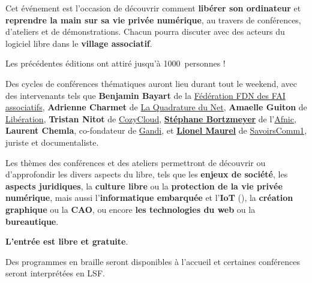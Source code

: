 
\Separateur

Cet événement est l'occasion de découvrir comment \textbf{libérer son ordinateur}
et \textbf{reprendre la main sur sa vie privée numérique},
au travers de conférences, d'ateliers et de démonstrations.
Chacun pourra discuter avec des acteurs du logiciel libre dans le \textbf{village associatif}.

Les précédentes éditions ont attiré jusqu'à \num{1000}~personnes !

\Separateur

Des cycles de conférences thématiques auront lieu durant tout le weekend,
avec des intervenants tels que \textbf{Benjamin Bayart} de la \href{http://ffdn.org/}{Fédération FDN des FAI associatifs},
\textbf{Adrienne Charmet} de \href{http://laquadrature.net/}{La Quadrature du Net},
\textbf{Amaelle Guiton} de \href{http://www.liberation.fr/auteur/15260-amaelle-guiton}{Libération},
\textbf{Tristan Nitot} de \href{https://cozy.io/fr/}{CozyCloud},
\textbf{\href{http://www.bortzmeyer.org/}{Stéphane Bortzmeyer}} de l'\href{http://www.afnic.fr}{Afnic},
\textbf{Laurent Chemla}, co-fondateur de \href{http://gandi.net/}{Gandi},
et \textbf{\href{http://scinfolex.com/}{Lionel Maurel}} de \href{http://savoirscom1.info/}{SavoirsComm1}, juriste et documentaliste.

\Separateur

Les thèmes des conférences et des ateliers permettront de découvrir ou d'approfondir
les divers aspects du libre, tels que les \textbf{enjeux de société}, les \textbf{aspects juridiques},
la \textbf{culture libre} ou la \textbf{protection de la vie privée numérique},
mais aussi l'\textbf{informatique embarquée} et l'\textbf{IoT} (), la \textbf{création graphique} ou la \textbf{CAO},
ou encore \textbf{les technologies du web} ou la \textbf{bureautique}.

\Separateur

\textbf{L'entrée est libre et gratuite}.

\Separateur

Des programmes en braille seront disponibles à l'accueil et certaines conférences seront interprétées en LSF.
